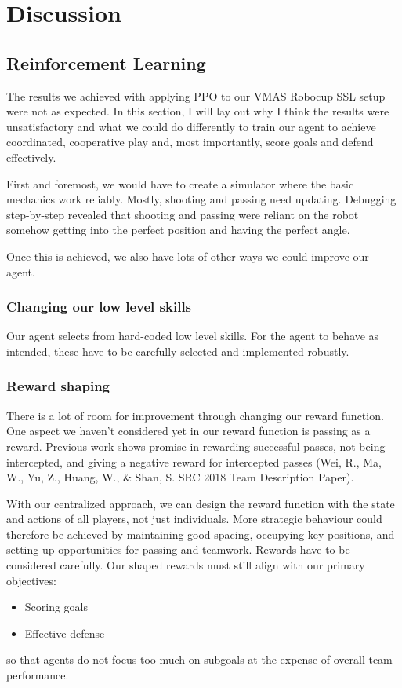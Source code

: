 \section{Discussion}
\label{section:disc}

\subsection{Reinforcement Learning}
The results we achieved with applying PPO to our VMAS Robocup SSL setup were not as expected.
In this section, I will lay out why I think the results were unsatisfactory and what we could do differently to train our agent to achieve coordinated, cooperative play and, most importantly, score goals and defend effectively.

First and foremost, we would have to create a simulator where the basic mechanics work reliably. Mostly, shooting and passing need updating.
Debugging step-by-step revealed that shooting and passing were reliant on the robot somehow getting into the perfect position and having the perfect angle.

Once this is achieved, we also have lots of other ways we could improve our agent.

\subsubsection{Changing our low level skills}
Our agent selects from hard-coded low level skills. For the agent to behave as intended, these have to be carefully selected and implemented robustly.

\subsubsection{Reward shaping}
There is a lot of room for improvement through changing our reward function.
One aspect we haven't considered yet in our reward function is passing as a reward.
Previous work shows promise in rewarding successful passes, not being intercepted, and giving a negative reward for intercepted passes
(Wei, R., Ma, W., Yu, Z., Huang, W., \& Shan, S. SRC 2018 Team Description Paper).

With our centralized approach, we can design the reward function with the state and actions of all players, not just individuals.
More strategic behaviour could therefore be achieved by maintaining good spacing, occupying key positions, and setting up opportunities for passing and teamwork.
Rewards have to be considered carefully. Our shaped rewards must still align with our primary objectives:
\begin{itemize}
    \item Scoring goals
    \item Effective defense
\end{itemize}
so that agents do not focus too much on subgoals at the expense of overall team performance.

